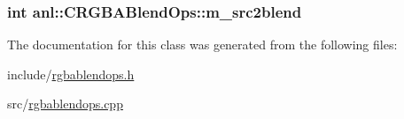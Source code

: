 \label{classanl_1_1CRGBABlendOps_a55568c4207291a6f422c014489480dbe}
\hypertarget{classanl_1_1CRGBABlendOps_a1eeaa9a775e2821f461a8cde474df19d}{
\subsubsection[{m\_\-src2blend}]{\setlength{\rightskip}{0pt plus 5cm}int {\bf anl::CRGBABlendOps::m\_\-src2blend}}}
\label{classanl_1_1CRGBABlendOps_a1eeaa9a775e2821f461a8cde474df19d}


The documentation for this class was generated from the following files:\begin{DoxyCompactItemize}
\item 
include/\hyperlink{rgbablendops_8h}{rgbablendops.h}\item 
src/\hyperlink{rgbablendops_8cpp}{rgbablendops.cpp}\end{DoxyCompactItemize}
